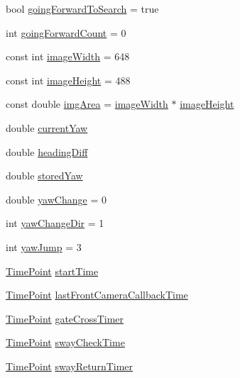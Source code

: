 \begin{DoxyCompactItemize}
\item 
bool \hyperlink{classPathPlanner_ac4737618f7b977a760c4044c8c11d978}{going\+Forward\+To\+Search} = true
\item 
int \hyperlink{classPathPlanner_a5882e35e164ea48ba9c45325bd0eeb74}{going\+Forward\+Count} = 0
\item 
const int \hyperlink{classPathPlanner_ab562d2e58308fd42088587858d7193ab}{image\+Width} = 648
\item 
const int \hyperlink{classPathPlanner_a83b54a87f884285d41642702c46368a8}{image\+Height} = 488
\item 
const double \hyperlink{classPathPlanner_aa95f3eb27d53bdf487145755a0cb85c9}{img\+Area} = \hyperlink{classPathPlanner_ab562d2e58308fd42088587858d7193ab}{image\+Width} $\ast$ \hyperlink{classPathPlanner_a83b54a87f884285d41642702c46368a8}{image\+Height}
\item 
double \hyperlink{classPathPlanner_a069162f445adcdef1e916ce8d43fd34a}{current\+Yaw}
\item 
double \hyperlink{classPathPlanner_a074f33607f0c0bb7a303e80d52ce79b4}{heading\+Diff}
\item 
double \hyperlink{classPathPlanner_ab3c86e85339eedec45c050955ca9a6b9}{stored\+Yaw}
\item 
double \hyperlink{classPathPlanner_a60f7621c34683c9e3b64d89a36358c48}{yaw\+Change} = 0
\item 
int \hyperlink{classPathPlanner_a43393934c97970d243fbb219ee8c909d}{yaw\+Change\+Dir} = 1
\item 
int \hyperlink{classPathPlanner_a2312e73d3f37acf470f448afaa262afe}{yaw\+Jump} = 3
\item 
\hyperlink{thruster__driver_8cpp_ad3e807c387dc076de974ff7eac67ad81}{Time\+Point} \hyperlink{classPathPlanner_a201a2c207e4abfee915a7acd5c9cae0e}{start\+Time}
\item 
\hyperlink{thruster__driver_8cpp_ad3e807c387dc076de974ff7eac67ad81}{Time\+Point} \hyperlink{classPathPlanner_aec7cfd25a48b711818991f5f449a050b}{last\+Front\+Camera\+Callback\+Time}
\item 
\hyperlink{thruster__driver_8cpp_ad3e807c387dc076de974ff7eac67ad81}{Time\+Point} \hyperlink{classPathPlanner_a4d3c427f732be34f6662f311436a3f5e}{gate\+Cross\+Timer}
\item 
\hyperlink{thruster__driver_8cpp_ad3e807c387dc076de974ff7eac67ad81}{Time\+Point} \hyperlink{classPathPlanner_a579c296b95e4dcb2f7e7b56b90082184}{sway\+Check\+Time}
\item 
\hyperlink{thruster__driver_8cpp_ad3e807c387dc076de974ff7eac67ad81}{Time\+Point} \hyperlink{classPathPlanner_a449a30ac5feb833004e42156124aeb35}{sway\+Return\+Timer}

\end{DoxyCompactItemize}
